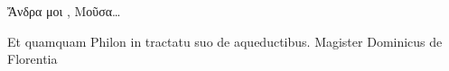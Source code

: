 \documentclass{book}
\begin{document}
\begin{pairs}
\begin{Leftside}
\begin{greek}
\beginnumbering
\pstart
Ἄνδρα μοι , Μοῦσα…
\pend
\endnumbering
\end{greek}
\end{Leftside}

\begin{Rightside} 
\beginnumbering
\pstart
Et quamquam Philon in tractatu suo de aqueductibus. Magister Dominicus de Florentia
\pend
\endnumbering
\end{Rightside}
\end{pairs}
\Columns
\end{document}
